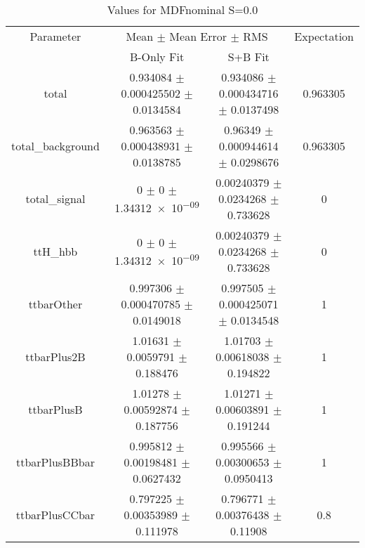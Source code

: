 \begin{table}
\centering
\caption{Values for MDFnominal S=0.0}
\begin{tabular}{cccc}
\toprule
Parameter & \multicolumn{2}{c}{Mean $\pm$ Mean Error $\pm$ RMS} & Expectation\\
 & B-Only Fit & S+B Fit & \\
\midrule
total & \num{0.934084} $\pm$ \num{0.000425502} $\pm$ \num{0.0134584} & \num{0.934086} $\pm$ \num{0.000434716} $\pm$ \num{0.0137498} & \num{0.963305}\\
total\_background & \num{0.963563} $\pm$ \num{0.000438931} $\pm$ \num{0.0138785} & \num{0.96349} $\pm$ \num{0.000944614} $\pm$ \num{0.0298676} & \num{0.963305}\\
total\_signal & \num{0} $\pm$ \num{0} $\pm$ \num{1.34312e-09} & \num{0.00240379} $\pm$ \num{0.0234268} $\pm$ \num{0.733628} & \num{0}\\
ttH\_hbb & \num{0} $\pm$ \num{0} $\pm$ \num{1.34312e-09} & \num{0.00240379} $\pm$ \num{0.0234268} $\pm$ \num{0.733628} & \num{0}\\
ttbarOther & \num{0.997306} $\pm$ \num{0.000470785} $\pm$ \num{0.0149018} & \num{0.997505} $\pm$ \num{0.000425071} $\pm$ \num{0.0134548} & \num{1}\\
ttbarPlus2B & \num{1.01631} $\pm$ \num{0.0059791} $\pm$ \num{0.188476} & \num{1.01703} $\pm$ \num{0.00618038} $\pm$ \num{0.194822} & \num{1}\\
ttbarPlusB & \num{1.01278} $\pm$ \num{0.00592874} $\pm$ \num{0.187756} & \num{1.01271} $\pm$ \num{0.00603891} $\pm$ \num{0.191244} & \num{1}\\
ttbarPlusBBbar & \num{0.995812} $\pm$ \num{0.00198481} $\pm$ \num{0.0627432} & \num{0.995566} $\pm$ \num{0.00300653} $\pm$ \num{0.0950413} & \num{1}\\
ttbarPlusCCbar & \num{0.797225} $\pm$ \num{0.00353989} $\pm$ \num{0.111978} & \num{0.796771} $\pm$ \num{0.00376438} $\pm$ \num{0.11908} & \num{0.8}\\
\bottomrule
\end{tabular}
\end{table}
